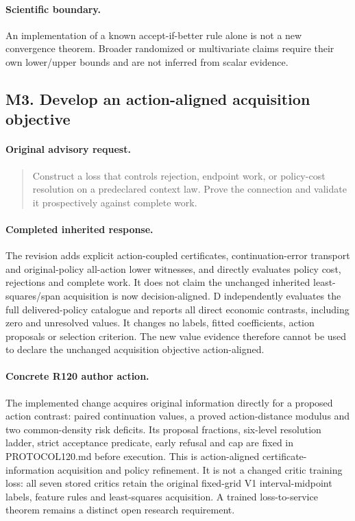 \paragraph{Scientific boundary.}
An implementation of a known accept-if-better rule alone is not a new convergence theorem. Broader randomized or multivariate claims require their own lower/upper bounds and are not inferred from scalar evidence.

\subsection{M3. Develop an action-aligned acquisition objective}
\label{response120:M3}
\paragraph{Original advisory request.}
\begin{quote}
Construct a loss that controls rejection, endpoint work, or policy-cost resolution on a predeclared context law. Prove the connection and validate it prospectively against complete work.
\end{quote}
\paragraph{Completed inherited response.}
The revision adds explicit action-coupled certificates, continuation-error transport and original-policy all-action lower witnesses, and directly evaluates policy cost, rejections and complete work. It does not claim the unchanged inherited least-squares/span acquisition is now decision-aligned. D independently evaluates the full delivered-policy catalogue and reports all direct economic contrasts, including zero and unresolved values. It changes no labels, fitted coefficients, action proposals or selection criterion. The new value evidence therefore cannot be used to declare the unchanged acquisition objective action-aligned.
\paragraph{Concrete R120 author action.}
The implemented change acquires original information directly for a proposed action contrast: paired continuation values, a proved action-distance modulus and two common-density risk deficits. Its proposal fractions, six-level resolution ladder, strict acceptance predicate, early refusal and cap are fixed in PROTOCOL120.md before execution. This is action-aligned certificate-information acquisition and policy refinement. It is not a changed critic training loss: all seven stored critics retain the original fixed-grid V1 interval-midpoint labels, feature rules and least-squares acquisition. A trained loss-to-service theorem remains a distinct open research requirement.
